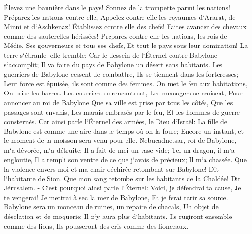 \verse Élevez une bannière dans le pays! Sonnez de la trompette parmi les nations! Préparez les nations contre elle, Appelez contre elle les royaumes d`Ararat, de Minni et d`Aschkenaz! Établissez contre elle des chefs! Faites avancer des chevaux comme des sauterelles hérissées! 
\verse Préparez contre elle les nations, les rois de Médie, Ses gouverneurs et tous ses chefs, Et tout le pays sous leur domination! 
\verse La terre s`ébranle, elle tremble; Car le dessein de l`Éternel contre Babylone s`accomplit; Il va faire du pays de Babylone un désert sans habitants. 
\verse Les guerriers de Babylone cessent de combattre, Ils se tiennent dans les forteresses; Leur force est épuisée, ils sont comme des femmes. On met le feu aux habitations, On brise les barres. 
\verse Les courriers se rencontrent, Les messagers se croisent, Pour annoncer au roi de Babylone Que sa ville est prise par tous les côtés, 
\verse Que les passages sont envahis, Les marais embrasés par le feu, Et les hommes de guerre consternés. 
\verse Car ainsi parle l`Éternel des armées, le Dieu d`Israël: La fille de Babylone est comme une aire dans le temps où on la foule; Encore un instant, et le moment de la moisson sera venu pour elle. 
\verse Nebucadnetsar, roi de Babylone, m`a dévorée, m`a détruite; Il a fait de moi un vase vide; Tel un dragon, il m`a engloutie, Il a rempli son ventre de ce que j`avais de précieux; Il m`a chassée. 
\verse Que la violence envers moi et ma chair déchirée retombent sur Babylone! Dit l`habitante de Sion. Que mon sang retombe sur les habitants de la Chaldée! Dit Jérusalem. - 
\verse C`est pourquoi ainsi parle l`Éternel: Voici, je défendrai ta cause, Je te vengerai! Je mettrai à sec la mer de Babylone, Et je ferai tarir sa source. 
\verse Babylone sera un monceau de ruines, un repaire de chacals, Un objet de désolation et de moquerie; Il n`y aura plus d`habitants. 
\verse Ils rugiront ensemble comme des lions, Ils pousseront des cris comme des lionceaux. 
